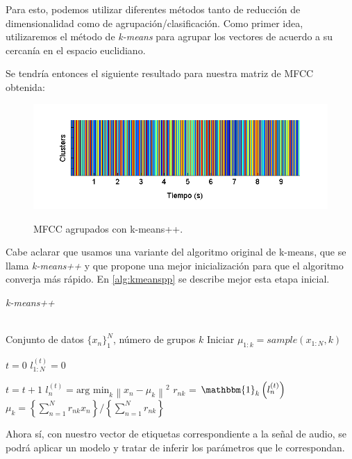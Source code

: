 Para esto, podemos utilizar diferentes métodos tanto de reducción de dimensionalidad como de agrupación/clasificación. Como primer idea, utilizaremos el método de \textit{k-means} para agrupar los vectores de acuerdo a su cercanía en el espacio euclidiano.

Se tendría entonces el siguiente resultado para nuestra matriz de MFCC obtenida:
\begin{figure}[t]
  {\includegraphics[width=0.9\linewidth]{gfx/chap2/signal-clusters}} \quad
  \caption{MFCC agrupados con k-means++.}
  \label{fig:sign_clusters}
\end{figure}
Cabe aclarar que usamos una variante del algoritmo original de k-means, que se llama \textit{k-means++} \cite{Arthur2007} y que propone una mejor inicialización para que el algoritmo converja más rápido. En \autoref{alg:kmeanspp} se describe mejor esta etapa inicial.

\begin{algorithm}[bth]
   \caption{\textit{k-means++}}
   \label{alg:kmeanspp}
\begin{algorithmic}
    \\ Conjunto de datos $\lbrace x_n \rbrace_1^N $, número de grupos $k$
   \STATE Iniciar $\mu_{1:k} = sample(x_{1:N}, k)$   
   
   \STATE $t = 0$
   \STATE $l_{1:N}^{(t)} = 0$
      
   \REPEAT  
   \STATE $t=t+1$ 
   \STATE $l_n^{(t)} = \text{arg min}_k {\left \| x_n - \mu_k \right \|}^2 $
   \STATE $r_{nk}$ = $\mathbbm{1}_k\left(l_n^{(t)}\right)$
   \STATE $\mu_k = \left\lbrace {\sum_{n=1}^N r_{nk} x_n} \right\rbrace / \left\lbrace {\sum_{n=1}^N r_{nk}} \right\rbrace $
\end{algorithmic}
\end{algorithm}

Ahora sí, con nuestro vector de etiquetas correspondiente a la señal de audio, se podrá aplicar un modelo y tratar de inferir los parámetros que le correspondan.



